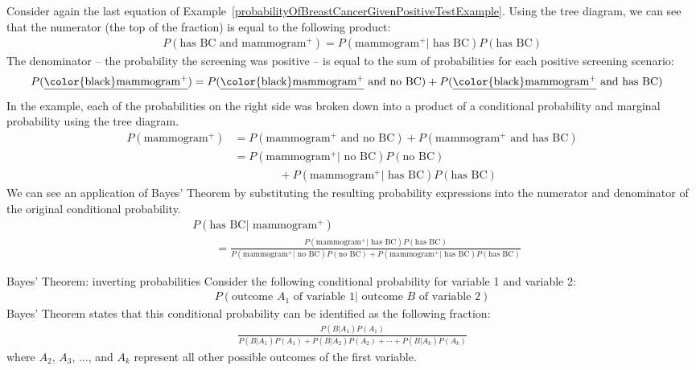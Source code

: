 Consider again the last equation of Example~\ref{probabilityOfBreastCancerGivenPositiveTestExample}.
Using the tree diagram, we can see that the numerator (the top of the fraction) is equal to the following product:
\begin{align*}
P(\text{has BC and mammogram$^+$}) = P(\text{mammogram$^+$} | \text{ has BC})P(\text{has BC})
\end{align*}
The denominator -- the probability the screening was positive -- is equal to the sum of probabilities for each positive screening scenario:
\begin{align*}
P(\text{\underline{\color{black}mammogram$^+$}})
	&= P(\text{\underline{\color{black}mammogram$^+$} and no BC})
		+ P(\text{\underline{\color{black}mammogram$^+$} and has BC})
\end{align*}
In the example, each of the probabilities on the right side was broken down into a product of a conditional probability and marginal probability using the tree diagram.
\begin{align*}
P(\text{mammogram$^+$})
	&= P(\text{mammogram$^+$ and no BC}) + P(\text{mammogram$^+$ and has BC}) \\
	&= P(\text{mammogram$^+$} | \text{ no BC})P(\text{no BC}) \\
			   &\qquad\qquad + P(\text{mammogram$^+$} | \text{ has BC})P(\text{has BC})
\end{align*}
We can see an application of Bayes' Theorem by substituting the resulting probability expressions into the numerator and denominator of the original conditional probability.
\begin{align*}
& P(\text{has BC} | \text{ mammogram$^+$})  \\
& \qquad= \frac{P(\text{mammogram$^+$} | \text{ has BC})P(\text{has BC})}
	{P(\text{mammogram$^+$} | \text{ no BC})P(\text{no BC}) + P(\text{mammogram$^+$} | \text{ has BC})P(\text{has BC})}
\end{align*}

\begin{onebox}{Bayes' Theorem: inverting probabilities}
Consider the following conditional probability for variable 1 and variable 2:\vspace{-1.5mm}
\begin{align*}
P(\text{outcome $A_1$ of variable 1} | \text{ outcome $B$ of variable 2})
\end{align*}
Bayes' Theorem states that this conditional probability can be identified as the following fraction:\vspace{-1.5mm}
\begin{align*}
\frac{P(B | A_1) P(A_1)}
	{P(B | A_1) P(A_1) + P(B | A_2) P(A_2) + \cdots + P(B | A_k) P(A_k)}
	\label{equationOfBayesTheorem}
\end{align*}
where $A_2$, $A_3$, ..., and $A_k$ represent all other possible outcomes of the first variable.
\end{onebox}

